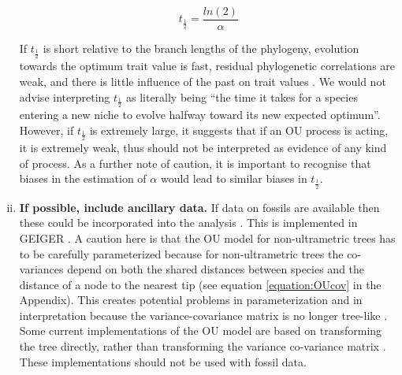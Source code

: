 \documentclass[a4paper,12pt]{article}
\begin{document}
\begin{enumerate}[(i)]
      \begin{equation}
        t_\frac{1}{2} = \frac{ln(2)}{\alpha}
        \label{equation:halflife}
      \end{equation}
    
    \noindent
    If $t_\frac{1}{2}$ is short relative to the branch lengths of the phylogeny, evolution towards the optimum trait value is fast, residual phylogenetic correlations are weak, and there is little influence of the past on trait values \citep{hansen1997stabilizing}.
    We would not advise interpreting $t_\frac{1}{2}$ as literally being ``the time it takes for a species entering a new niche to evolve halfway toward its new expected optimum''.
    However, if $t_\frac{1}{2}$ is extremely large, it suggests that if an OU process is acting, it is extremely weak, thus should not be interpreted as evidence of any kind of process. 
    As a further note of caution, it is important to recognise that biases in the estimation of $\alpha$ would lead to similar biases in $t_\frac{1}{2}$.
  
    
    \item \textbf{If possible, include ancillary data.}
    If data on fossils are available then these could be incorporated into the analysis \citep{Slater:2012ab}.
    This is implemented in GEIGER \citep{Harmon:2008aa}.
    A caution here is that the OU model for non-ultrametric trees has to be carefully parameterized because for non-ultrametric trees the co-variances depend on both the shared distances between species and the distance of a node to the nearest tip (see equation \ref{equation:OUcov} in the Appendix). 
    This creates potential problems in parameterization and in interpretation because the variance-covariance matrix is no longer tree-like \citep{slater2014correction}.
    Some current implementations of the OU model are based on transforming the tree directly, rather than transforming the variance co-variance matrix \citep[e.g., MOTMOT;][]{Thomas:2011aa}. 
    These implementations should not be used with fossil data.
   \end{enumerate}  
    
\end{document}
